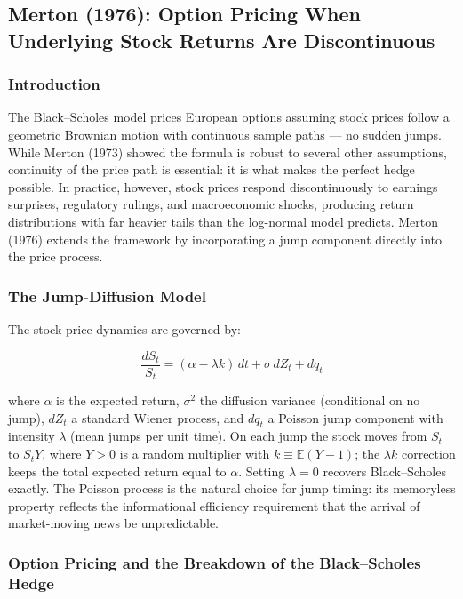 \documentclass[12pt]{article}
\begin{document}
\subsection*{Merton (1976): Option Pricing When Underlying Stock Returns Are Discontinuous}

\subsubsection*{Introduction}

The Black--Scholes model prices European options assuming stock prices follow a geometric
Brownian motion with continuous sample paths --- no sudden jumps. While Merton (1973) showed
the formula is robust to several other assumptions, continuity of the price path is essential:
it is what makes the perfect hedge possible. In practice, however, stock prices respond
discontinuously to earnings surprises, regulatory rulings, and macroeconomic shocks, producing
return distributions with far heavier tails than the log-normal model predicts. Merton (1976)
extends the framework by incorporating a jump component directly into the price process.

\subsubsection*{The Jump-Diffusion Model}

The stock price dynamics are governed by:

\begin{equation}
    \frac{dS_t}{S_t} = (\alpha - \lambda k)\,dt + \sigma\,dZ_t + dq_t
\end{equation}

where $\alpha$ is the expected return, $\sigma^2$ the diffusion variance (conditional on no
jump), $dZ_t$ a standard Wiener process, and $dq_t$ a Poisson jump component with intensity
$\lambda$ (mean jumps per unit time). On each jump the stock moves from $S_t$ to $S_t Y$,
where $Y>0$ is a random multiplier with $k \equiv \mathbb{E}(Y-1)$; the $\lambda k$ correction
keeps the total expected return equal to $\alpha$. Setting $\lambda = 0$ recovers Black--Scholes
exactly. The Poisson process is the natural choice for jump timing: its memoryless property
reflects the informational efficiency requirement that the arrival of market-moving news be
unpredictable.

\subsubsection*{Option Pricing and the Breakdown of the Black--Scholes Hedge}
\end{document}
